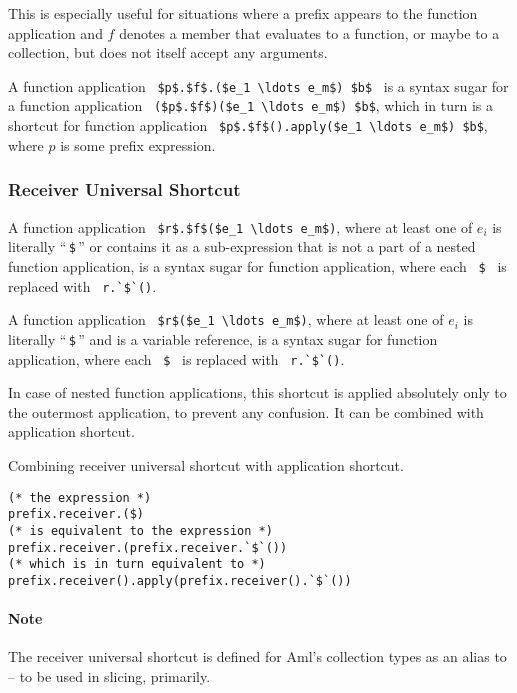 This is especially useful for situations where a prefix appears to the function application and $f$ denotes a member that evaluates to a function, or maybe to a collection, but does not itself accept any arguments. 

A function application ~\lstinline!$p$.$f$.($e_1 \ldots e_m$) $b$!~ is a syntax sugar for a function application ~\lstinline!($p$.$f$)($e_1 \ldots e_m$) $b$!, which in turn is a shortcut for function application ~\lstinline!$p$.$f$().apply($e_1 \ldots e_m$) $b$!, where $p$ is some prefix expression. 





\subsubsection{Receiver Universal Shortcut}
\label{sec:receiver-universal-shortcut}

A function application ~\lstinline!$r$.$f$($e_1 \ldots e_m$)!, where at least one of $e_i$ is literally ``\,\lstinline[mathescape=false]!$!\,'' or contains it as a sub-expression that is not a part of a nested function application, is a syntax sugar for function application, where each ~\lstinline[mathescape=false]!$!~ is replaced with ~\lstinline[mathescape=false]!r.`$`()!. 

A function application ~\lstinline!$r$($e_1 \ldots e_m$)!, where at least one of $e_i$ is literally ``\,\lstinline[mathescape=false]!$!\,'' and  is a variable reference, is a syntax sugar for function application, where each ~\lstinline[mathescape=false]!$!~ is replaced with ~\lstinline[mathescape=false]!r.`$`()!. 

In case of nested function applications, this shortcut is applied absolutely only to the outermost application, to prevent any confusion. It can be combined with application shortcut.

\example Combining receiver universal shortcut with application shortcut.
\begin{lstlisting}[mathescape=false]
(* the expression *)
prefix.receiver.($)
(* is equivalent to the expression *)
prefix.receiver.(prefix.receiver.`$`())
(* which is in turn equivalent to *)
prefix.receiver().apply(prefix.receiver().`$`())
\end{lstlisting}

\paragraph{Note}
The receiver universal shortcut is defined for Aml's collection types as an alias to  -- to be used in slicing, primarily. 






